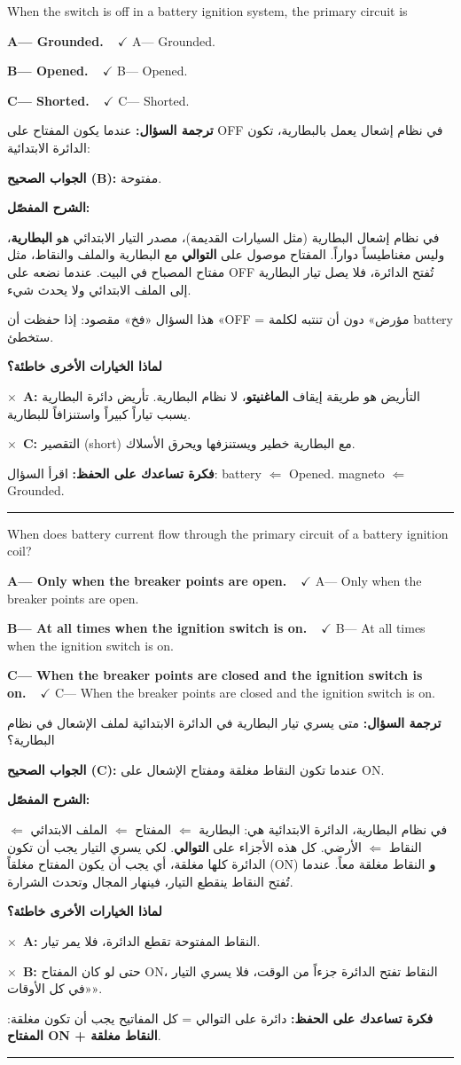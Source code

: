 \documentclass[11pt,a4paper]{article}
\newcommand{\en}[1]{\textenglish{#1}}
\newcommand{\correctletter}{}
\newcommand{\opt}[2]{%
  \ifdefstring{\correctletter}{#1}%
    {\textcolor{ansgreen}{\textbf{#1— #2\ \ $\checkmark$}}}%
    {#1— #2}\par}
\newcommand{\Q}[6]{%
  \renewcommand{\correctletter}{#6}%
  \par\bigskip
  \phantomsection\label{q#1}%
  \begin{tcolorbox}[enhanced,breakable,colback=qback,colframe=qframe,
      arc=2mm,boxrule=0.8pt,fonttitle=\bfseries,
      title={\en{Question #1}}]
    \begin{english}
      #2\par\smallskip
      \opt{A}{#3}\opt{B}{#4}\opt{C}{#5}
    \end{english}
  \end{tcolorbox}}
\newcommand{\tr}[1]{\textbf{\textcolor{qframe}{ترجمة السؤال:}} #1\par}
\newcommand{\ans}[2]{%
  \begin{tcolorbox}[colback=ansback,colframe=ansgreen,boxrule=0.6pt,arc=1.5mm,
      left=4pt,right=4pt,top=2pt,bottom=2pt]
    \textbf{\textcolor{ansgreen}{الجواب الصحيح (\en{#1}):}} #2
  \end{tcolorbox}}
\newcommand{\sharh}[1]{\textbf{\textcolor{conceptc}{الشرح المفصّل:}}\par #1\par}
\newcommand{\nohead}{\textbf{\textcolor{wrongc}{لماذا الخيارات الأخرى خاطئة؟}}\par}
\newcommand{\no}[2]{\hspace*{1em}\textcolor{wrongc}{$\times$}\ \textbf{\en{#1}:} #2\par}
\newcommand{\tip}[1]{%
  \begin{tcolorbox}[colback=tipback,colframe=tipframe,boxrule=0.5pt,arc=1.5mm,
      left=4pt,right=4pt,top=2pt,bottom=2pt]
    \textbf{فكرة تساعدك على الحفظ:} #1
  \end{tcolorbox}}
\newcommand{\qsep}{\par\medskip\noindent\textcolor{qframe!40}{\rule{\linewidth}{0.4pt}}\par}
\begin{document}
\Q{8522}{When the switch is off in a battery ignition system, the primary circuit is}
{Grounded.}
{Opened.}
{Shorted.}{B}
\tr{عندما يكون المفتاح على \en{OFF} في نظام إشعال يعمل بالبطارية، تكون الدائرة الابتدائية:}
\ans{B}{مفتوحة.}
\sharh{في نظام إشعال البطارية (مثل السيارات القديمة)، مصدر التيار الابتدائي هو \textbf{البطارية}، وليس مغناطيساً دواراً. المفتاح موصول على \textbf{التوالي} مع البطارية والملف والنقاط، مثل مفتاح المصباح في البيت. عندما نضعه على \en{OFF} تُفتح الدائرة، فلا يصل تيار البطارية إلى الملف الابتدائي ولا يحدث شيء.

هذا السؤال «فخ» مقصود: إذا حفظت أن «\en{OFF} = مؤرض» دون أن تنتبه لكلمة \en{battery} ستخطئ.}
\nohead
\no{A}{التأريض هو طريقة إيقاف \textbf{الماغنيتو}، لا نظام البطارية. تأريض دائرة البطارية يسبب تياراً كبيراً واستنزافاً للبطارية.}
\no{C}{التقصير (\en{short}) مع البطارية خطير ويستنزفها ويحرق الأسلاك.}
\tip{اقرأ السؤال: \en{battery} $\Leftarrow$ \en{Opened}. \en{magneto} $\Leftarrow$ \en{Grounded}.}
\qsep

\Q{8581}{When does battery current flow through the primary circuit of a battery ignition coil?}
{Only when the breaker points are open.}
{At all times when the ignition switch is on.}
{When the breaker points are closed and the ignition switch is on.}{C}
\tr{متى يسري تيار البطارية في الدائرة الابتدائية لملف الإشعال في نظام البطارية؟}
\ans{C}{عندما تكون النقاط مغلقة ومفتاح الإشعال على \en{ON}.}
\sharh{في نظام البطارية، الدائرة الابتدائية هي: البطارية $\Leftarrow$ المفتاح $\Leftarrow$ الملف الابتدائي $\Leftarrow$ النقاط $\Leftarrow$ الأرضي. كل هذه الأجزاء على \textbf{التوالي}. لكي يسري التيار يجب أن تكون الدائرة كلها مغلقة، أي يجب أن يكون المفتاح مغلقاً (\en{ON}) \textbf{و} النقاط مغلقة معاً. عندما تُفتح النقاط ينقطع التيار، فينهار المجال وتحدث الشرارة.}
\nohead
\no{A}{النقاط المفتوحة تقطع الدائرة، فلا يمر تيار.}
\no{B}{حتى لو كان المفتاح \en{ON}، النقاط تفتح الدائرة جزءاً من الوقت، فلا يسري التيار «في كل الأوقات».}
\tip{دائرة على التوالي = كل المفاتيح يجب أن تكون مغلقة: \textbf{المفتاح \en{ON} + النقاط مغلقة}.}
\qsep
\end{document}
